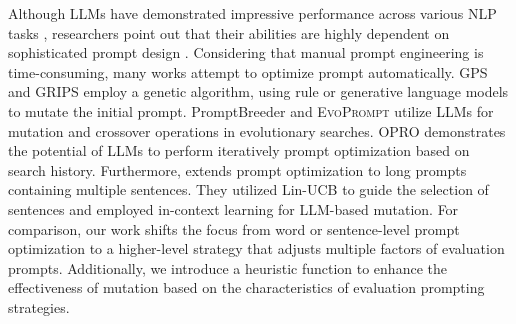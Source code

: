 Although LLMs have demonstrated impressive performance across various NLP tasks \cite{zhao2023survey}, researchers point out that their abilities are highly dependent on sophisticated prompt design \cite{pryzant-etal-2023-automatic, leidinger-etal-2023-language, raina-etal-2024-llm}. Considering that manual prompt engineering is time-consuming, many works attempt to optimize prompt automatically. GPS \cite{xu-etal-2022-gps} and GRIPS \cite{prasad-etal-2023-grips} employ a genetic algorithm, using rule or generative language models to mutate the initial prompt. PromptBreeder \cite{fernando2023promptbreeder} and \textsc{EvoPrompt} \cite{guo2023connecting} utilize LLMs for mutation and crossover operations in evolutionary searches. OPRO \cite{yang2023large}  demonstrates the potential of LLMs to perform iteratively prompt optimization based on search history.
Furthermore, \citet{hsieh-etal-2024-automatic} extends prompt optimization to long prompts containing multiple sentences. They utilized Lin-UCB to guide the selection of sentences and employed in-context learning for LLM-based mutation.
For comparison, our work shifts the focus from word or sentence-level prompt optimization to a higher-level strategy that adjusts multiple factors of evaluation prompts. 
Additionally, we introduce a heuristic function to enhance the effectiveness of mutation based on the characteristics of evaluation prompting strategies.



